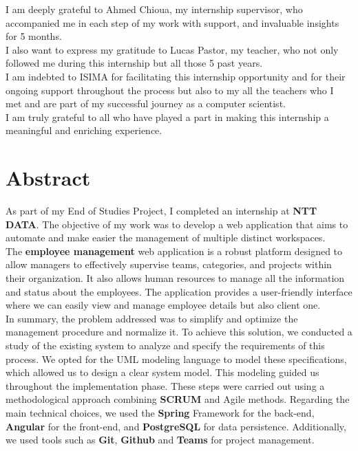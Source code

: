 \documentclass[12pt,a4paper,table,english]{article}
\begin{document}
	I am deeply grateful to Ahmed Chioua, my internship supervisor, who accompanied me in each step of my work with support, and invaluable insights for 5 months.\\
	
	I also want to express my gratitude to Lucas Pastor, my teacher, who not only followed me during this internship but all those 5 past years.\\
		
	I am indebted to ISIMA for facilitating this internship opportunity and for their ongoing support throughout the process but also to my all the teachers who I met and are part of my successful journey as a computer scientist.\\
			
	I am truly grateful to all who have played a part in making this internship a meaningful and enriching experience.\\
	
	\pagebreak
	
	\listoffigures
	\pagebreak
	
	\listoftables
	\pagebreak

	\section{Abstract}
	
	As part of my End of Studies Project, I completed an internship at \textbf{NTT DATA}. The objective of my work was to develop a web application that aims to automate and make easier the management of multiple distinct workspaces.\\
	
	The \textbf{employee management} web application is a robust platform designed to allow managers to effectively supervise teams, categories, and projects within their organization. It also allows human resources to manage all the information and status about the employees. The application provides a user-friendly interface where we can easily view and manage employee details but also client one.\\
	
	In summary, the problem addressed was to simplify and optimize the management
	procedure and normalize it.	To achieve this solution, we conducted a study of the existing system to analyze and specify the requirements of this process. We opted for the UML modeling language to model these specifications, which allowed us to design a clear system model. This modeling guided us throughout the implementation phase. These steps
	were carried out using a methodological approach combining \textbf{SCRUM} and Agile methods. Regarding the main technical choices, we used the \textbf{Spring} Framework for the back-end, \textbf{Angular} for the front-end, and \textbf{PostgreSQL} for data persistence.
	Additionally, we used tools such as \textbf{Git}, \textbf{Github} and \textbf{Teams} for project management.\\
	
\end{document}
